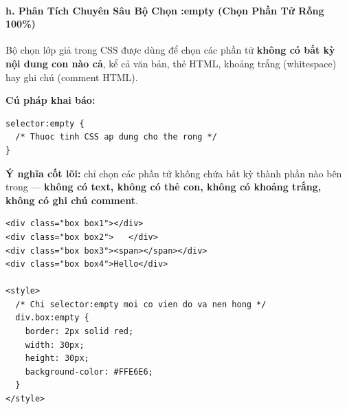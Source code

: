 
\paragraph{h. Phân Tích Chuyên Sâu Bộ Chọn :empty (Chọn Phần Tử Rỗng 100\%)}
\mbox{}\par\vspace{2pt}

Bộ chọn lớp giả  trong CSS được dùng để chọn các phần tử \textbf{không có bất kỳ nội dung con nào cả}, kể cả văn bản, thẻ HTML, khoảng trắng (whitespace) hay ghi chú (comment HTML).

\begin{conceptBox}
\textbf{Cú pháp khai báo:}
\begin{codeWindow}
\begin{lstlisting}[language=CSS3]
selector:empty {
  /* Thuoc tinh CSS ap dung cho the rong */
}
\end{lstlisting}
\end{codeWindow}
\par\vspace{4pt}
\textbf{Ý nghĩa cốt lõi:}  chỉ chọn các phần tử không chứa bất kỳ thành phần nào bên trong --- \textbf{không có text, không có thẻ con, không có khoảng trắng, không có ghi chú comment}.
\end{conceptBox}

\begin{codeWindow}
\begin{lstlisting}[language=HTML5]
<div class="box box1"></div>
<div class="box box2">   </div>
<div class="box box3"><span></span></div>
<div class="box box4">Hello</div>

<style>
  /* Chi selector:empty moi co vien do va nen hong */
  div.box:empty {
    border: 2px solid red;
    width: 30px;
    height: 30px;
    background-color: #FFE6E6;
  }
</style>
\end{lstlisting}
\end{codeWindow}


